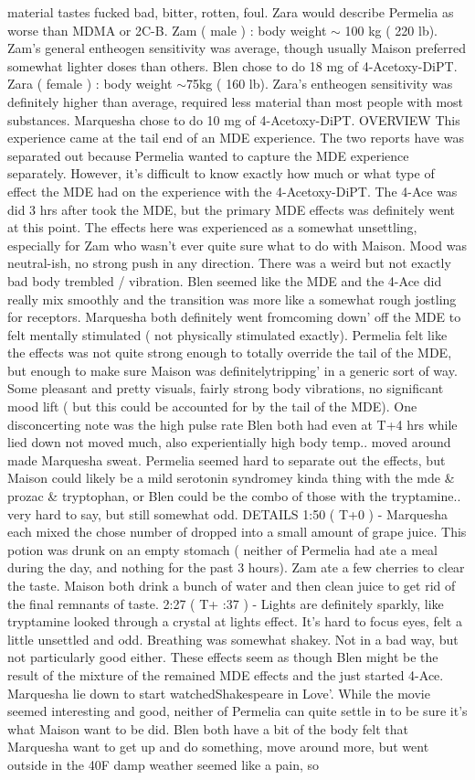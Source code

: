 \documentclass[12pt]{book}
\begin{document}
material tastes fucked bad, bitter, rotten, foul. Zara would describe Permelia as worse than MDMA or 2C-B. Zam ( male ) : body weight $\sim$ 100 kg ( 220 lb). Zam's general entheogen sensitivity was average, though usually Maison preferred somewhat lighter doses than others. Blen chose to do 18 mg of 4-Acetoxy-DiPT. Zara ( female ) : body weight $\sim$75kg ( 160 lb). Zara's entheogen sensitivity was definitely higher than average, required less material than most people with most substances. Marquesha chose to do 10 mg of 4-Acetoxy-DiPT. OVERVIEW This experience came at the tail end of an MDE experience. The two reports have was separated out because Permelia wanted to capture the MDE experience separately. However, it's difficult to know exactly how much or what type of effect the MDE had on the experience with the 4-Acetoxy-DiPT. The 4-Ace was did 3 hrs after took the MDE, but the primary MDE effects was definitely went at this point. The effects here was experienced as a somewhat unsettling, especially for Zam who wasn't ever quite sure what to do with Maison. Mood was neutral-ish, no strong push in any direction. There was a weird but not exactly bad body trembled / vibration. Blen seemed like the MDE and the 4-Ace did really mix smoothly and the transition was more like a somewhat rough jostling for receptors. Marquesha both definitely went fromcoming down' off the MDE to felt mentally stimulated ( not physically stimulated exactly). Permelia felt like the effects was not quite strong enough to totally override the tail of the MDE, but enough to make sure Maison was definitelytripping' in a generic sort of way. Some pleasant and pretty visuals, fairly strong body vibrations, no significant mood lift ( but this could be accounted for by the tail of the MDE). One disconcerting note was the high pulse rate Blen both had even at T+4 hrs while lied down not moved much, also experientially high body temp.. moved around made Marquesha sweat. Permelia seemed hard to separate out the effects, but Maison could likely be a mild serotonin syndromey kinda thing with the mde \& prozac \& tryptophan, or Blen could be the combo of those with the tryptamine.. very hard to say, but still somewhat odd. DETAILS 1:50 ( T+0 ) - Marquesha each mixed the chose number of dropped into a small amount of grape juice. This potion was drunk on an empty stomach ( neither of Permelia had ate a meal during the day, and nothing for the past 3 hours). Zam ate a few cherries to clear the taste. Maison both drink a bunch of water and then clean juice to get rid of the final remnants of taste. 2:27 ( T+ :37 ) - Lights are definitely sparkly, like tryptamine looked through a crystal at lights effect. It's hard to focus eyes, felt a little unsettled and odd. Breathing was somewhat shakey. Not in a bad way, but not particularly good either. These effects seem as though Blen might be the result of the mixture of the remained MDE effects and the just started 4-Ace. Marquesha lie down to start watchedShakespeare in Love'. While the movie seemed interesting and good, neither of Permelia can quite settle in to be sure it's what Maison want to be did. Blen both have a bit of the body felt that Marquesha want to get up and do something, move around more, but went outside in the 40F damp weather seemed like a pain, so 
\end{document}
